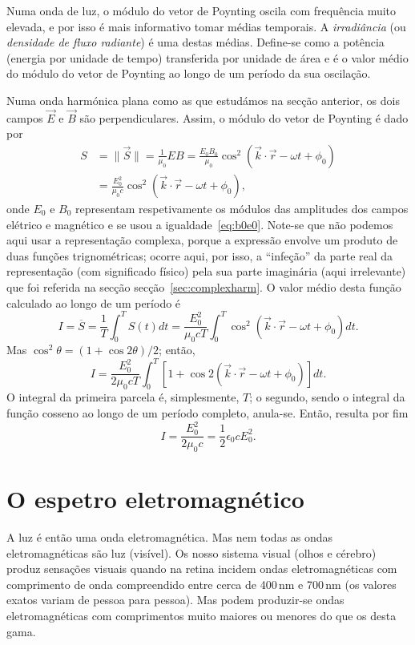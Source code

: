 Numa onda de luz, o módulo do vetor de Poynting oscila com frequência muito
elevada, e por isso é mais informativo tomar médias temporais. A
\emph{irradiância} (ou \emph{densidade de fluxo radiante}) é uma destas médias.
Define-se como a potência (energia por unidade de tempo) transferida por unidade
de área e é o valor médio do módulo do vetor de Poynting ao longo de um período
da sua oscilação.

Numa onda harmónica plana como as que estudámos na secção anterior, os dois
campos $\vec E$ e $\vec B$ são perpendiculares. Assim, o módulo do vetor de
Poynting é dado por
\begin{align*}
  S&=\|\vec S\|=\frac{1}{\mu_0}EB=
  \frac{E_0B_0}{\mu_0}\cos^2\left(\vec k\cdot\vec r-\omega t+\phi_0\right)\\
  &=
  \frac{E^2_0}{\mu_0c}\cos^2\left(\vec k\cdot\vec r-\omega t+\phi_0\right),
\end{align*}
onde $E_0$ e $B_0$ representam respetivamente os módulos das amplitudes dos
campos elétrico e magnético e se usou a igualdade~\eqref{eq:b0e0}. Note-se que
não podemos aqui usar a representação complexa, porque a expressão envolve um
produto de duas funções trignométricas; ocorre aqui, por isso, a ``infeção'' da
parte real da representação (com significado físico) pela sua parte imaginária
(aqui irrelevante) que foi referida na secção secção~\ref{sec:complexharm}.  O
valor médio desta função calculado ao longo de um período é
\begin{equation*}
  I=\overline S=\frac{1}{T}\int_{0}^TS(t)dt=\frac{E_0^2}{\mu_0cT}
  \int_0^T\cos^2\left(\vec k\cdot\vec r-\omega t+\phi_0\right)dt.
\end{equation*}
Mas $\cos^2\theta=(1+\cos2\theta)/2$; então,
\begin{equation*}
  I=\frac{E_0^2}{2\mu_0cT}
  \int_0^T\left[1+\cos2\left(\vec k\cdot\vec r-\omega t+\phi_0\right)\right]dt.
\end{equation*}
O integral da primeira parcela é, simplesmente, $T$; o segundo, sendo o integral
da função cosseno ao longo de um período completo, anula-se. Então, resulta por
fim
\begin{equation}
  I=\frac{E_0^2}{2\mu_0c}=\frac{1}{2}\epsilon_0cE_0^2.
\end{equation}



\section{O espetro eletromagnético}
A luz é então uma onda eletromagnética. Mas nem todas as ondas eletromagnéticas
são luz (visível). Os nosso sistema visual (olhos e cérebro) produz sensações
visuais quando na retina incidem ondas eletromagnéticas com comprimento de onda
compreendido entre cerca de 400\,nm e 700\,nm (os valores exatos variam de
pessoa para pessoa). Mas podem produzir-se ondas eletromagnéticas com
comprimentos muito maiores ou menores do que os desta gama.

